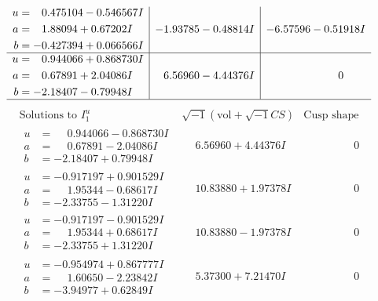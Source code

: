 \documentclass[1p]{elsarticle_modified}
\theoremstyle{definition}
\newcommand{\I}{\sqrt{-1}}
\begin{document}
$$\begin{array}{c|c|c}
\begin{aligned}
u &= \phantom{-}0.475104 - 0.546567 I \\
a &= \phantom{-}1.88094 + 0.67202 I \\
b &= -0.427394 + 0.066566 I\end{aligned}
 & -1.93785 - 0.48814 I & -6.57596 - 0.51918 I \\ \hline\begin{aligned}
u &= \phantom{-}0.944066 + 0.868730 I \\
a &= \phantom{-}0.67891 + 2.04086 I \\
b &= -2.18407 - 0.79948 I\end{aligned}
 & \phantom{-}6.56960 - 4.44376 I & \phantom{-0.000000 } 0\\
 \hline 
 \end{array}$$\newpage$$\begin{array}{c|c|c}  
\text{Solutions to }I^u_{1}& \I (\text{vol} + \sqrt{-1}CS) & \text{Cusp shape}\\
 \hline 
\begin{aligned}
u &= \phantom{-}0.944066 - 0.868730 I \\
a &= \phantom{-}0.67891 - 2.04086 I \\
b &= -2.18407 + 0.79948 I\end{aligned}
 & \phantom{-}6.56960 + 4.44376 I & \phantom{-0.000000 } 0 \\ \hline\begin{aligned}
u &= -0.917197 + 0.901529 I \\
a &= \phantom{-}1.95344 - 0.68617 I \\
b &= -2.33755 - 1.31220 I\end{aligned}
 & \phantom{-}10.83880 + 1.97378 I & \phantom{-0.000000 } 0 \\ \hline\begin{aligned}
u &= -0.917197 - 0.901529 I \\
a &= \phantom{-}1.95344 + 0.68617 I \\
b &= -2.33755 + 1.31220 I\end{aligned}
 & \phantom{-}10.83880 - 1.97378 I & \phantom{-0.000000 } 0 \\ \hline\begin{aligned}
u &= -0.954974 + 0.867777 I \\
a &= \phantom{-}1.60650 - 2.23842 I \\
b &= -3.94977 + 0.62849 I\end{aligned}
 & \phantom{-}5.37300 + 7.21470 I & \phantom{-0.000000 } 0 \\ \hline\begin{aligned}

\end{aligned}
\end{array}$$
\end{document}
